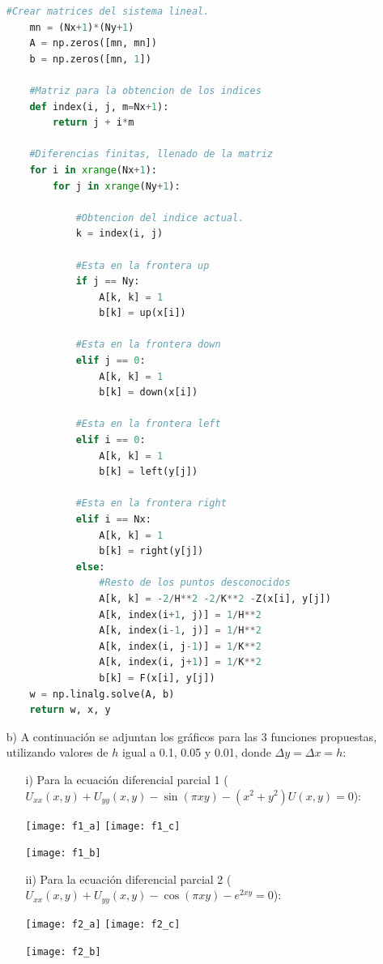 \documentclass[letterpaper]{article}
\newcommand{\5}
{
\\[.5cm]
}
\begin{document}
\begin{itemize}
\begin{lstlisting}[language=Python]
	#Crear matrices del sistema lineal.
	mn = (Nx+1)*(Ny+1)
	A = np.zeros([mn, mn])
	b = np.zeros([mn, 1])

	#Matriz para la obtencion de los indices
	def index(i, j, m=Nx+1):
		return j + i*m

	#Diferencias finitas, llenado de la matriz
	for i in xrange(Nx+1):
		for j in xrange(Ny+1):

			#Obtencion del indice actual.
			k = index(i, j)

			#Esta en la frontera up
			if j == Ny:
				A[k, k] = 1
				b[k] = up(x[i])

			#Esta en la frontera down
			elif j == 0:
				A[k, k] = 1
				b[k] = down(x[i])

			#Esta en la frontera left
			elif i == 0:
				A[k, k] = 1
				b[k] = left(y[j])

			#Esta en la frontera right
			elif i == Nx:
				A[k, k] = 1
				b[k] = right(y[j])
			else:
				#Resto de los puntos desconocidos
				A[k, k] = -2/H**2 -2/K**2 -Z(x[i], y[j])
				A[k, index(i+1, j)] = 1/H**2
				A[k, index(i-1, j)] = 1/H**2
				A[k, index(i, j-1)] = 1/K**2
				A[k, index(i, j+1)] = 1/K**2
				b[k] = F(x[i], y[j])
	w = np.linalg.solve(A, b)
	return w, x, y
\end{lstlisting}

\item[b)] A continuación se adjuntan los gráficos para las 3 funciones propuestas, utilizando valores de $h$ igual a 0.1, 0.05 y 0.01, donde $\Delta y = \Delta x = h$:

	\begin{itemize}
    	\item[i)] Para la ecuación diferencial parcial 1 ($U_{xx}(x,y)+U_{yy}(x,y)-\sin(\pi x y) - (x^2+ y^2)U(x,y) = 0$):
        \begin{center}
        	\centerline{%
            	\texttt{[image: f1\_a]}%
            	\texttt{[image: f1\_c]}%
            }%
            \centerline{%
            	\texttt{[image: f1\_b]}%
              	\hspace{0.5\linewidth}  
            }%
        \end{center}
        
        \item[ii)] Para la ecuación diferencial parcial 2 ($U_{xx}(x,y)+U_{yy}(x,y)-\cos(\pi x y)-e^{2xy} = 0$):
        \begin{center}
        	\centerline{%
            	\texttt{[image: f2\_a]}%
            	\texttt{[image: f2\_c]}%
            }%
            \centerline{%
            	\texttt{[image: f2\_b]}%
                \hspace{0.5\linewidth}
            }%
        \end{center}
        

\end{itemize}
\end{itemize}
\end{document}
